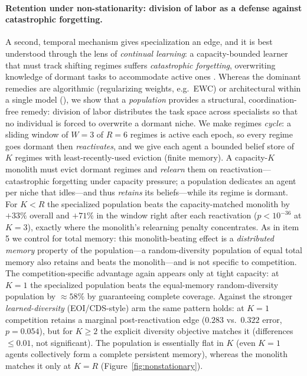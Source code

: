 \documentclass{article}
\begin{document}
\paragraph{Retention under non-stationarity: division of labor as a defense
against catastrophic forgetting.} A second, temporal mechanism gives
specialization an edge, and it is best understood through the lens of
\emph{continual learning}: a
capacity-bounded learner that must track shifting regimes suffers
\emph{catastrophic forgetting}, overwriting knowledge of dormant tasks to
accommodate active ones \citep{french1999catastrophic,kirkpatrick2017overcoming,
parisi2019continual}. Whereas the dominant remedies are algorithmic (regularizing
weights, e.g.\ EWC) or architectural within a single model
(\citealp{rusu2016progressive}), we show that a \emph{population} provides a
structural, coordination-free remedy: division of labor distributes the task space
across specialists so that no individual is forced to overwrite a dormant niche. We
make regimes \emph{cycle}: a
sliding window of $W{=}3$ of $R{=}6$ regimes is active each epoch, so every
regime goes dormant then \emph{reactivates}, and we give each agent a bounded
belief store of $K$ regimes with least-recently-used eviction (finite memory). A
capacity-$K$ monolith must evict dormant regimes and \emph{relearn} them on
reactivation---catastrophic forgetting under capacity pressure; a population
dedicates an agent per niche that idles---and thus
\emph{retains} its beliefs---while its regime is dormant. For $K{<}R$ the
specialized population beats the capacity-matched monolith by $+33\%$ overall and
$+71\%$ in the window right after each reactivation ($p<10^{-36}$ at $K{=}3$),
exactly where the monolith's relearning penalty concentrates. As in item 5 we
control for total memory: this monolith-beating effect is a \emph{distributed
memory} property of the population---a random-diversity population of equal total
memory also retains and beats the monolith---and is not specific to competition.
The competition-specific advantage again appears only at tight capacity: at
$K{=}1$ the specialized population beats the equal-memory random-diversity
population by $\approx 58\%$ by guaranteeing complete coverage. Against the
stronger \emph{learned-diversity} (EOI/CDS-style) arm the same pattern holds: at
$K{=}1$ competition retains a marginal post-reactivation edge ($0.283$ vs.\ $0.322$
error, $p{=}0.054$), but for $K\geq2$ the explicit diversity objective matches it
(differences $\leq0.01$, not significant). The population is
essentially flat in $K$ (even $K{=}1$ agents collectively form a complete
persistent memory), whereas the monolith matches it only at $K{=}R$
(Figure~\ref{fig:nonstationary}).
\end{document}
